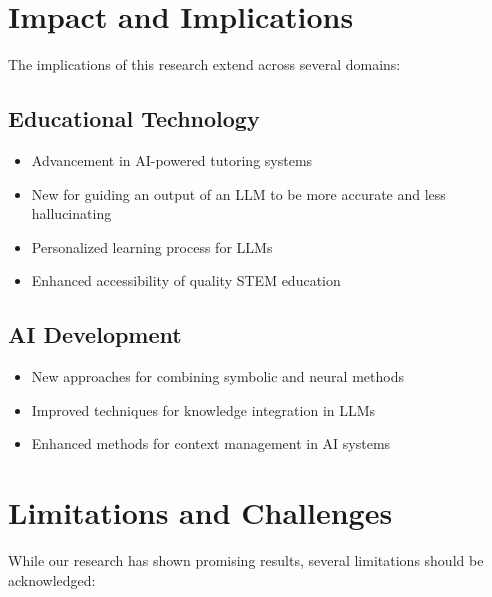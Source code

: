 \section{Impact and Implications}
\label{sec:impact}

The implications of this research extend across several domains:

\subsection{Educational Technology}
\begin{itemize}
    \item Advancement in AI-powered tutoring systems
    \item New for guiding an output of an LLM to be more accurate and less hallucinating
    \item Personalized learning process for LLMs
    \item Enhanced accessibility of quality STEM education
\end{itemize}

\subsection{AI Development}
\begin{itemize}
    \item New approaches for combining symbolic and neural methods
    \item Improved techniques for knowledge integration in LLMs
    \item Enhanced methods for context management in AI systems
\end{itemize}

\section{Limitations and Challenges}
\label{sec:limitations}

While our research has shown promising results, several limitations should be acknowledged:

